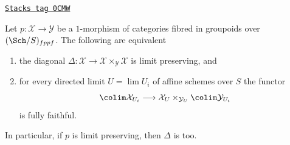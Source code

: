 \begin{lemma}
\label{stacks-limits-lemma-limit-preserving-diagonal}
\href{https://stacks.math.columbia.edu/tag/0CMW}{\texttt{Stacks tag 0CMW}}

Let $p : \mathcal{X} \to \mathcal{Y}$ be a $1$-morphism of categories
fibred in groupoids over $(\Sch/S)_{fppf}$. The following are equivalent
\begin{enumerate}
\item the diagonal
$\Delta : \mathcal{X} \to \mathcal{X} \times_\mathcal{Y} \mathcal{X}$
is limit preserving, and
\item for every directed limit $U = \lim U_i$ of affine schemes over $S$
the functor
$$
\colim \mathcal{X}_{U_i} \longrightarrow
\mathcal{X}_U \times_{\mathcal{Y}_U} \colim \mathcal{Y}_{U_i}
$$
is fully faithful.
\end{enumerate}
In particular, if $p$ is limit preserving, then $\Delta$ is too.
\end{lemma}

